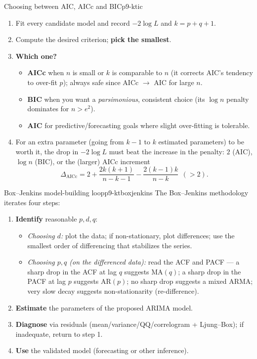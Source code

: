 \begin{keytech}{Choosing between AIC, AICc and BIC}{p9-ktic}
\begin{enumerate}
  \item Fit every candidate model and record $-2\log L$ and $k=p+q+1$.
  \item Compute the desired criterion; \textbf{pick the smallest}.
  \item \textbf{Which one?}
    \begin{itemize}
      \item \textbf{AICc} when $n$ is small or $k$ is comparable to $n$ (it
            corrects AIC's tendency to over-fit $p$); always safe since
            AICc $\to$ AIC for large $n$.
      \item \textbf{BIC} when you want a \emph{parsimonious}, consistent choice
            (its $\log n$ penalty dominates for $n>e^2$).
      \item \textbf{AIC} for predictive/forecasting goals where slight
            over-fitting is tolerable.
    \end{itemize}
  \item For an extra parameter (going from $k-1$ to $k$ estimated parameters) to
        be worth it, the drop in $-2\log L$ must beat the increase in the penalty:
        $2$ (AIC), $\log n$ (BIC), or the (larger) AICc increment
        \[
        \Delta_{\mathrm{AICc}}
        = 2 + \frac{2k(k+1)}{n-k-1} - \frac{2(k-1)k}{n-k}\ \ (>2).
        \]
\end{enumerate}
\end{keytech}

\begin{keytech}{Box--Jenkins model-building loop}{p9-ktboxjenkins}
The Box--Jenkins methodology iterates four steps:
\begin{enumerate}
  \item \textbf{Identify} reasonable $p,d,q$:
        \begin{itemize}
          \item \emph{Choosing $d$:} plot the data; if non-stationary, plot
                differences; use the smallest order of differencing that
                stabilizes the series.
          \item \emph{Choosing $p,q$ (on the differenced data):} read the ACF
                and PACF --- a sharp drop in the ACF at lag $q$ suggests
                MA$(q)$; a sharp drop in the PACF at lag $p$ suggests AR$(p)$;
                no sharp drop suggests a mixed ARMA; very slow decay suggests
                non-stationarity (re-difference).
        \end{itemize}
  \item \textbf{Estimate} the parameters of the proposed ARIMA model.
  \item \textbf{Diagnose} via residuals (mean/variance/QQ/correlogram +
        Ljung--Box); if inadequate, return to step 1.
  \item \textbf{Use} the validated model (forecasting or other inference).
\end{enumerate}
\end{keytech}

